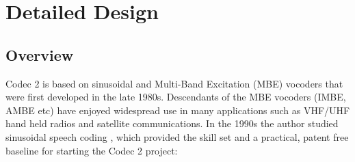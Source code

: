 \documentclass{article}
\begin{document}
\section{Detailed Design}
\label{sect:details}

\subsection{Overview}

Codec 2 is based on sinusoidal \cite{mcaulay1986speech} and Multi-Band Excitation (MBE) \cite{griffin1988multiband} vocoders that were first developed in the late 1980s.  Descendants of the MBE vocoders (IMBE, AMBE etc) have enjoyed widespread use in many applications such as VHF/UHF hand held radios and satellite communications. In the 1990s the author studied sinusoidal speech coding \cite{rowe1997techniques}, which provided the skill set and a practical, patent free baseline for starting the Codec 2 project:
\end{document}
